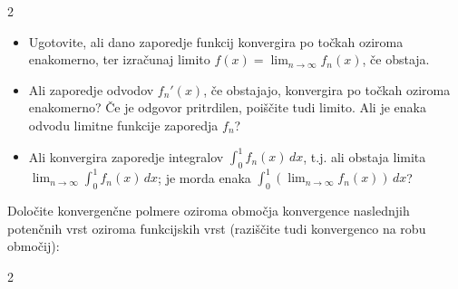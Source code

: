 \documentclass[11pt,a4paper]{exam}
\renewcommand{\{}{\lbrace}
\renewcommand{\}}{\rbrace}
\begin{document}
\begin{questions}
\begin{multicols}{2}
	\end{multicols}
	
	\begin{itemize}
		\item Ugotovite, ali dano zaporedje funkcij konvergira po točkah oziroma enakomerno, ter izračunaj limito $f(x) = \lim_{n \to \infty} f_n(x)$, če obstaja.
		\item Ali zaporedje odvodov $f_n'(x)$, če obstajajo, konvergira po točkah oziroma enakomerno? Če je odgovor pritrdilen, poiščite tudi limito. Ali je enaka odvodu limitne funkcije zaporedja $f_n$?
		\item Ali konvergira zaporedje integralov $\int_0^1 f_n(x) \, dx$, t.j. ali obstaja limita $\lim_{n \to \infty} \int_0^1 f_n(x) \, dx$; je morda enaka $\int_0^1 (\lim_{n \to \infty} f_n(x)) \, dx$?
	\end{itemize}
	
	\question Določite konvergenčne polmere oziroma območja konvergence naslednjih potenčnih vrst oziroma funkcijskih vrst (raziščite tudi konvergenco na robu območij):
	\begin{multicols}{2}
	\end{multicols}
	
	\end{questions}
	
\end{document}
